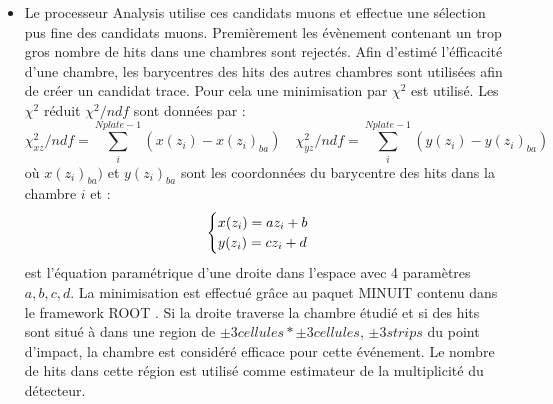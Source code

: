 \begin{itemize}[label=$\bullet$]
	\item Le processeur Analysis utilise ces candidats muons et effectue une sélection pus fine des candidats muons. Premièrement les évènement contenant un trop gros nombre de hits dans une chambres sont rejectés. Afin d'estimé l'éfficacité d'une chambre, les barycentres des hits des autres chambres sont utilisées afin de créer un candidat trace. Pour cela une minimisation par $\chi^2$ est utilisé. Les $\chi^2$ réduit $\chi^2/ndf$ sont données par :
	\begin{equation}
	\chi_{xz}^2/ndf=\sum_i^{Nplate-1}(x(z_{i})-x(z_{i})_{ba}) \quad \chi_{yz}^2/ndf=\sum_i^{Nplate-1}(y(z_{i})-y(z_{i})_{ba})
	\end{equation}
	où $x(z_{i})_{ba})$ et $y(z_{i})_{ba}$ sont les coordonnées du barycentre des hits dans la chambre $i$ et :
\begin{equation}
\begin{cases}
\strut x(z_i)=az_i+b\\
y(z_i)=cz_i+d
\end{cases}
\end{equation}
est l'équation paramétrique d'une droite dans l'espace avec 4 paramètres $a,b,c,d$. La minimisation est effectué grâce au paquet MINUIT \cite{James:2004xla} contenu dans le framework ROOT \cite{BRUN199781}.
Si la droite traverse la chambre étudié et si des hits sont situé à dans une region de $\pm 3 cellules*\pm 3 cellules$, $\pm 3 strips$ du point d'impact, la chambre est considéré efficace pour cette événement. Le nombre de hits dans cette région est utilisé comme estimateur de la multiplicité du détecteur.
\end{itemize}
